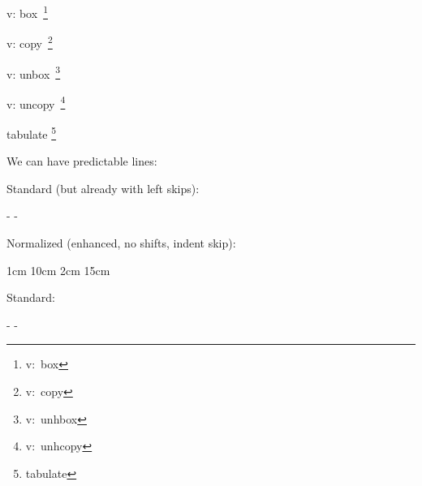 v: \hbox{box    \footnote{v:     box}}\vbox{}\par
v: \hbox{copy   \footnote{v:    copy}}\vbox{}\par
v: \hbox{unbox  \footnote{v:  unhbox}}\vbox{}\par
v: \hbox{uncopy \footnote{v: unhcopy}}\vbox{}\par

\starttabulate[||]
\NC tabulate \footnote{tabulate} \NC \NR
\stoptabulate
\stopbuffer

\typebuffer[style={\tt\small}]

\page

\startpacked \getbuffer \stoppacked



\stoptitle

\starttitle[title=Normalizing lines]

We can have predictable lines:

\startbuffer
         \par
\stopbuffer

\typebuffer

Standard (but already with left skips):

\start
    \bitwiseflip \normalizelinemode -\indentskipmodecode
    \bitwiseflip \normalizelinemode -\normalizelinemodecode
    \showmakeup \relax \getbuffer
\stop

Normalized (enhanced, no shifts, indent skip):

\start
    \bitwiseflip \normalizelinemode \indentskipmodecode
    \bitwiseflip \normalizelinemode \normalizelinemodecode
    \showmakeup \relax \getbuffer
\stop

\page

\startbuffer
     1cm 10cm 2cm 15cm    \par
\stopbuffer

\typebuffer

Standard:

\start
    \bitwiseflip \normalizelinemode -\indentskipmodecode
    \bitwiseflip \normalizelinemode -\normalizelinemodecode
    \showmakeup \relax \getbuffer
\stop

